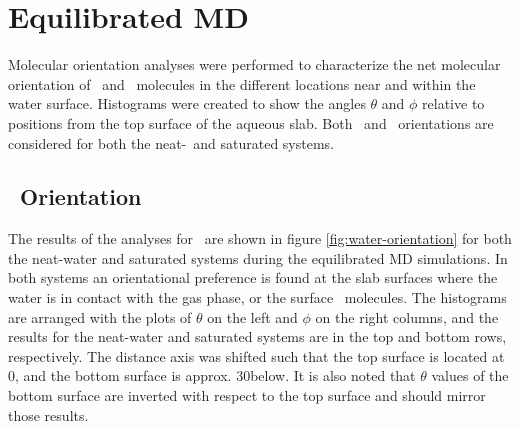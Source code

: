 \section{Equilibrated MD}

Molecular orientation analyses were performed to characterize the net molecular orientation of \wat~and \suldiox~molecules in the different locations near and within the water surface. Histograms were created to show the angles $\theta$ and $\phi$ relative to positions from the top surface of the aqueous slab. Both \wat~and \suldiox~orientations are considered for both the neat-\wat~and saturated systems.

\subsection{\wat~Orientation}

The results of the analyses for \wat~are shown in figure \ref{fig:water-orientation} for both the neat-water and saturated systems during the equilibrated MD simulations. In both systems an orientational preference is found at the slab surfaces where the water is in contact with the gas phase, or the surface \suldiox~molecules. The histograms are arranged with the plots of $\theta$ on the left and $\phi$ on the right columns, and the results for the neat-water and saturated systems are in the top and bottom rows, respectively. The distance axis was shifted such that the top surface is located at 0\angs, and the bottom surface is approx. 30\angs below. It is also noted that $\theta$ values of the bottom surface are inverted with respect to the top surface and should mirror those results. %

